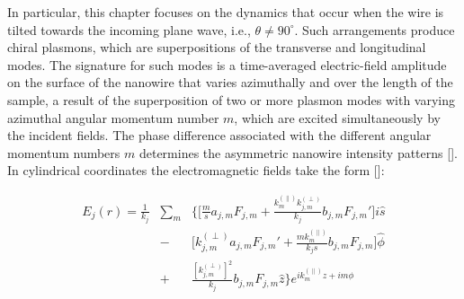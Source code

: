 In particular, this chapter focuses on the dynamics that occur when the wire is tilted towards the incoming plane wave, i.e., $\theta \neq 90^\circ$. Such arrangements produce chiral plasmons, which are superpositions of the transverse and longitudinal modes.  The signature for such modes is a time-averaged electric-field amplitude on the surface of the nanowire that varies azimuthally and over the length of the sample, a result of the superposition of two or more plasmon modes with varying azimuthal angular momentum number $m$, which are excited simultaneously by the incident fields.  The phase difference associated with the different angular momentum numbers $m$ determines the asymmetric nanowire intensity patterns [\cite{Zhang2011}]. In cylindrical coordinates the electromagnetic fields take the form [\cite{Chang2007}]:

\begin{eqnarray}\label{Efield}
E_j(r) = \frac{1}{k_j}& \sum_m&\Big\{\big[\frac{m}{s}a_{j,m}F_{j,m}+\frac{k^{(\parallel)}_{m}k^{(\perp)}_{j ,m}}{k_j}b_{j,m}F_{j,m}'\big]i\hat{s}\nonumber \\
  &-&\big[{k_{j ,m}^{(\perp)}}a_{j,m}F_{j,m}'+\frac{mk^{(\parallel)}_{m}}{k_js}b_{j,m}F_{j,m}\big]\hat{\phi} \\
  &+& \frac{[k^{(\perp)}_{j ,m}]^2}{k_j}b_{j,m}F_{j,m}\hat{z}\Big\}e^{ik^{(\parallel)}_{m}z+im\phi} \nonumber
\end{eqnarray}



